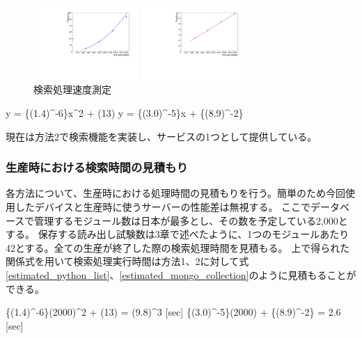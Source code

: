 \begin{figure}[bpt]
  \begin{center}
  \begin{minipage}{0.4\hsize}
    \includegraphics[width=4cm,angle=270]{result_python_list_search.pdf}
  \end{minipage}
  \begin{minipage}{0.4\hsize}
    \includegraphics[width=4cm,angle=270]{result_mongo_collection_search.pdf}
  \end{minipage}

  \caption[検索処理速度測定]{検索処理速度測定}
  \label{searching_time}
  \end{center}
\end{figure}

\bbb
y =  \{(1.4)^{-6}\}x^2 + (13)
\label{function_python_list}
\eee
\bbb
y = \{(3.0)^{-5}\}x + \{(8.9)^{-2}\}
\label{function_mongo_collection}
\eee

現在は方法2で検索機能を実装し、サービスの1つとして提供している。

\subsubsection{生産時における検索時間の見積もり}
各方法について、生産時における処理時間の見積もりを行う。簡単のため今回使用したデバイスと生産時に使うサーバーの性能差は無視する。
ここでデータベースで管理するモジュール数は日本が最多とし、その数を予定している2,000とする。
保存する読み出し試験数は3章で述べたように、1つのモジュールあたり42とする。全ての生産が終了した際の検索処理時間を見積もる。
上で得られた関係式を用いて検索処理実行時間は方法1、2に対して式\ref{estimated_python_list}、\ref{estimated_mongo_collection}のように見積もることができる。

\bbb
\{(1.4)^{-6}\}\times(2000)^2 + (13) = (9.8)^{3} [\rm{sec}]
\label{estimated_python_list}
\eee
\bbb
\{(3.0)^{-5}\}\times(2000) + \{(8.9)^{-2}\} = 2.6 [\rm{sec}]
\label{estimated_mongo_collection}
\eee

